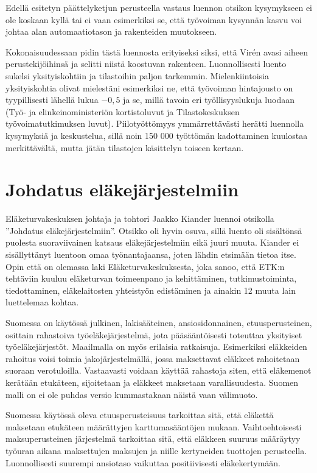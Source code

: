 \documentclass[12pt]{article}
\begin{document}
Edellä esitetyn päättelyketjun perusteella vastaus luennon otsikon kysymykseen
ei ole koskaan kyllä tai ei vaan esimerkiksi se, että työvoiman kysynnän kasvu
voi johtaa alan automaatiotason ja rakenteiden muutokseen.

Kokonaisuudessaan pidin tästä luennosta erityiseksi siksi, että Virén avasi
aiheen perustekijöihinsä ja selitti niistä koostuvan rakenteen. Luonnollisesti
luento sukelsi yksityiskohtiin ja tilastoihin paljon tarkemmin.
Mielenkiintoisia yksityiskohtia olivat mielestäni esimerkiksi ne, että
työvoiman hintajousto on tyypillisesti lähellä lukua $-0,5$ ja se, millä tavoin
eri työllisyyslukuja luodaan (Työ- ja elinkeinoministeriön kortistoluvut ja
Tilastokeskuksen työ\-voi\-ma\-tut\-ki\-muk\-sen luvut). Piilotyöttömyys
ymmärrettävästi herätti luennolla kysymyksiä ja keskustelua, sillä noin 150 000
työttömän kadottaminen kuulostaa merkittävältä, mutta jätän tilastojen
käsittelyn toiseen kertaan.


\newpage
\section{Johdatus eläkejärjestelmiin}

Eläketurvakeskuksen johtaja ja tohtori Jaakko Kiander luennoi otsikolla
''Johdatus eläkejärjestelmiin''. Otsikko oli hyvin osuva, sillä luento oli
sisältönsä puolesta suoraviivainen katsaus eläkejärjestelmiin eikä juuri muuta.
Kiander ei sisällyttänyt luentoon omaa työnantajaansa, joten lähdin etsimään
tietoa itse. Opin että on olemassa laki Eläketurvakeskuksesta, joka sanoo, että
ETK:n tehtäviin kuuluu eläketurvan toimeenpano ja kehittäminen,
tutkimustoiminta, tiedottaminen, eläkelaitosten yhteistyön edistäminen ja
ainakin 12 muuta lain luettelemaa kohtaa.

Suomessa on käytössä julkinen, lakisääteinen, ansiosidonnainen,
etuusperusteinen, osittain rahastoiva työeläkejärjestelmä, jota pääsääntöisesti
toteuttaa yksityiset työeläkejärjestöt. Maailmalla on myös erilaisia
ratkaisuja. Esimerkiksi eläkkeiden rahoitus voisi toimia jakojärjestelmällä,
jossa maksettavat eläkkeet rahoitetaan suoraan verotuloilla. Vastaavasti
voidaan käyttää rahastoja siten, että eläkemenot kerätään etukäteen,
sijoitetaan ja eläkkeet maksetaan varallisuudesta. Suomen malli on ei ole
puhdas versio kummastakaan näistä vaan välimuoto.

Suomessa käytössä oleva etuusperusteisuus tarkoittaa sitä, että eläkettä
maksetaan etukäteen määrättyjen karttumasääntöjen mukaan. Vaihtoehtoisesti
maksuperusteinen järjestelmä tarkoittaa sitä, että eläkkeen suuruus määräytyy
työuran aikana maksettujen maksujen ja niille kertyneiden tuottojen
perusteella. Luonnollisesti suurempi ansiotaso vaikuttaa positiivisesti
eläkekertymään.
\end{document}
